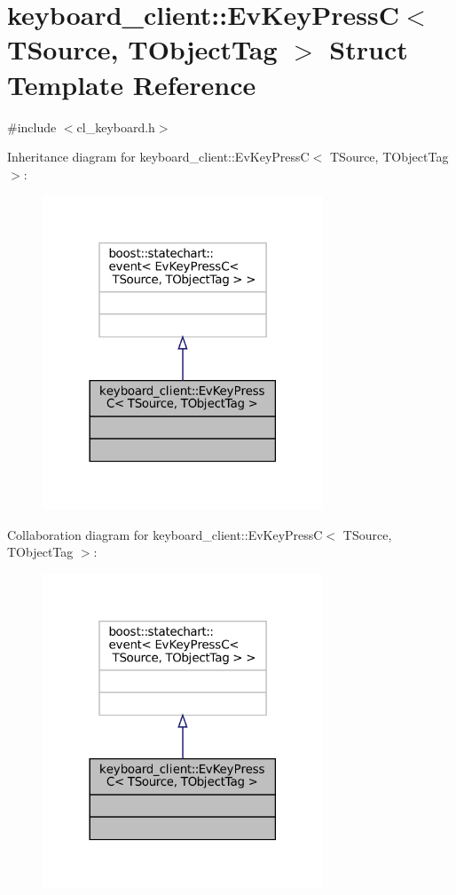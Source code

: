 \hypertarget{structkeyboard__client_1_1EvKeyPressC}{}\section{keyboard\+\_\+client\+:\+:Ev\+Key\+PressC$<$ T\+Source, T\+Object\+Tag $>$ Struct Template Reference}
\label{structkeyboard__client_1_1EvKeyPressC}


{\ttfamily \#include $<$cl\+\_\+keyboard.\+h$>$}



Inheritance diagram for keyboard\+\_\+client\+:\+:Ev\+Key\+PressC$<$ T\+Source, T\+Object\+Tag $>$\+:
\nopagebreak
\begin{figure}[H]
\begin{center}
\leavevmode
\includegraphics[width=237pt]{structkeyboard__client_1_1EvKeyPressC__inherit__graph}
\end{center}
\end{figure}


Collaboration diagram for keyboard\+\_\+client\+:\+:Ev\+Key\+PressC$<$ T\+Source, T\+Object\+Tag $>$\+:
\nopagebreak
\begin{figure}[H]
\begin{center}
\leavevmode
\includegraphics[width=237pt]{structkeyboard__client_1_1EvKeyPressC__coll__graph}
\end{center}
\end{figure}



